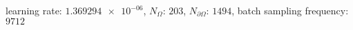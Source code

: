 learning rate: $\num[scientific-notation=true]{1.369294e-06}$, $N_{\Omega}$: $\num[scientific-notation=false]{203}$, $N_{\partial\Omega}$: $\num[scientific-notation=false]{1494}$, batch sampling frequency: $\num[scientific-notation=false]{9712}$